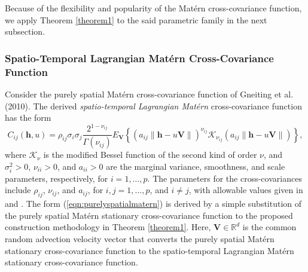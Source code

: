 \documentclass[12pt]{article}
\newcommand{\0}{\mathbf{0}}
\begin{document}
Because of the flexibility and popularity of the Mat\'{e}rn cross-covariance function, we apply Theorem \ref{theorem1} to the said parametric family in the next subsection.

\subsubsection{Spatio-Temporal Lagrangian Mat\'{e}rn Cross-Covariance Function}

Consider the purely spatial Mat\'{e}rn cross-covariance function of Gneiting et al. (2010). The derived \textit{spatio-temporal Lagrangian Mat\'{e}rn} cross-covariance function has the form
\begin{equation}\label{eqn:purelyspatialmatern}
C_{ij}(\mathbf{h},u)= \rho_{ij} \sigma_{i}\sigma_{j}\frac{2^{1-\nu_{ij}}}{\Gamma\left(\nu_{ij}\right)}E_{\mathbf{V}} \left\{\left(a_{ij}\|\mathbf{h}-u\mathbf{V}\|\right)^{\nu_{ij}}\mathcal{K}_{\nu_{ij}}\left(a_{ij}\|\mathbf{h}-u\mathbf{V}\|\right)\right\},
\end{equation}
where $\mathcal{K}_\nu$ is the modified Bessel function of the second kind of order $\nu$, and $\sigma_{i}^{2}>0$, $\nu_{ii}>0$, and $a_{ii}>0$ are the marginal variance, smoothness, and scale parameters, respectively, for $i=1,\ldots,p$.  The parameters for the cross-covariances include $\rho_{ij}$, $\nu_{ij}$, and $a_{ij}$, for $i,j=1,\ldots,p$, and $i\neq j$, with allowable values given in \citet{apanasovich2012valid} and \citet{gneiting2010matern}. The form (\ref{eqn:purelyspatialmatern}) is derived by a simple substitution of the purely spatial Mat\'{e}rn stationary cross-covariance function to the proposed construction methodology in Theorem \ref{theorem1}.  Here, $\mathbf{V}\in \mathbb{R}^d$ is the common random advection velocity vector that converts the purely spatial Mat\'{e}rn stationary cross-covariance function to the spatio-temporal Lagrangian Mat\'{e}rn stationary cross-covariance function.
\end{document}
